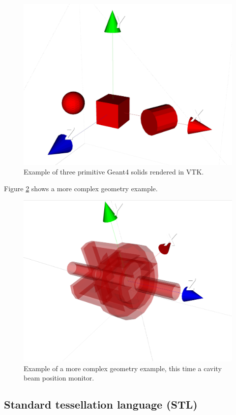 \documentclass[a4paper,
               keeplastbox,   %
               ]{jacow}
\begin{document}
\begin{figure}[!htb]
   \centering
   \includegraphics*[width=.9\columnwidth]{./examples/simple.jpg}
   \caption{Example of three primitive Geant4 solids rendered in VTK.}
   \label{fig:simple}
\end{figure}

Figure \ref{fig:dipole} shows a more complex geometry example. 
\begin{figure}[!htb]
   \centering
   \includegraphics*[width=.9\columnwidth]{./examples/dipole.jpg}
   \caption{Example of a more complex geometry example, this time a cavity beam position monitor.}
   \label{fig:dipole}
\end{figure}

%

\subsection{Standard tessellation language (STL)}
\end{document}
